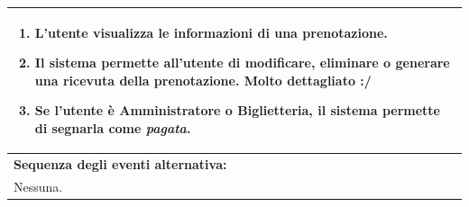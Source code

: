 \documentclass{article}
\begin{document}
\begin{table}[H]
\begin{tabular}{|p{\linewidth}|}
\begin{minipage}{\linewidth}
\begin{enumerate}
                                \item L'utente visualizza le informazioni di una prenotazione.
                                \item Il sistema permette all'utente di modificare, eliminare o generare una ricevuta della prenotazione.  Molto dettagliato :/
                                \item Se l'utente è Amministratore o Biglietteria, il sistema permette di segnarla come \emph{pagata}.
                            \end{enumerate}
                        \end{minipage}
                        \vspace{0pt} \\
                        \hline
                        \textbf{Sequenza degli eventi alternativa:} \\
                        Nessuna. \\
                        \hline
                    \end{tabular}
                \end{table}
\end{document}
